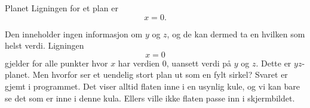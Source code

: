 \begin{surferPage}{Planet}
Ligningen for et plan er \[x=0.\]

Den inneholder ingen informasjon om $y$ og $z$, og de kan dermed ta en hvilken som helst verdi. Ligningen \[x=0\] gjelder
 for alle punkter hvor $x$ har verdien $0$, uansett verdi på $y$ og $z$. Dette er $yz$-planet.
\newline \newline
Men hvorfor ser et uendelig stort plan ut som en fylt sirkel? Svaret er gjemt i programmet. Det viser 
alltid flaten inne i en usynlig kule, og vi kan bare se det som er inne i denne kula. Ellers 
ville ikke flaten passe inn i skjermbildet.
\end{surferPage}
